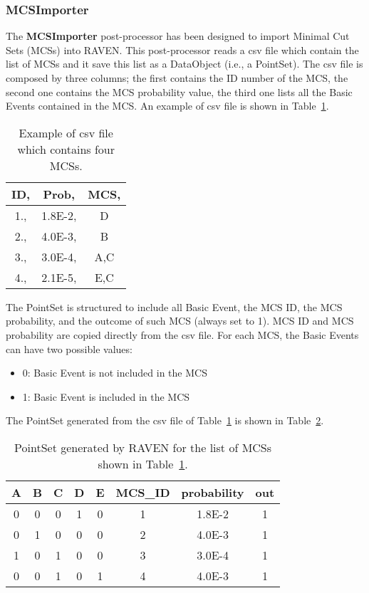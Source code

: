 
\subsubsection{MCSImporter}
\label{MCSimporterPP}
The \textbf{MCSImporter} post-processor has been designed to import Minimal Cut Sets (MCSs) into RAVEN.
This post-processor reads a csv file which contain the list of MCSs and it save this list as a DataObject 
(i.e.,  a PointSet).
The csv file is composed by three columns; the first contains the ID number of the MCS, the second one contains
the MCS probability value, the third one lists all the Basic Events contained in the MCS.
An example of csv file is shown in Table~\ref{MCScsv}.

\begin{table}[h]
    \centering
    \caption{Example of csv file which contains four MCSs.}
    \label{MCScsv}
	\begin{tabular}{c  c  c}
		\hline
		ID, & Prob, & MCS, \\
		\hline
		1.,  &  1.8E-2, &  D  \\
		2.,  &  4.0E-3, &  B \\
		3.,  &  3.0E-4, &  A,C  \\
		4.,  &  2.1E-5, &  E,C \\
		\hline
	\end{tabular}
\end{table}

The PointSet is structured to include all Basic Event, the MCS ID, the MCS probability, and the outcome of such MCS 
(always set to 1).
MCS ID and MCS probability are copied directly from the csv file.
For each MCS, the Basic Events can have two possible values:
  \begin{itemize}
    \item  0: Basic Event is not included in the MCS
    \item  1: Basic Event is included in the MCS
  \end{itemize}
The PointSet generated from the csv file of Table~\ref{MCScsv} is shown in Table~\ref{PointSetMCSExpandFalse}.
\begin{table}[h]
    \centering
    \caption{PointSet generated by RAVEN for the list of MCSs shown in Table~\ref{MCScsv}.}
    \label{PointSetMCSExpandFalse}
	\begin{tabular}{c | c | c | c | c | c | c | c }
		\hline
		A & B & C & D & E & MCS\_ID & probability & out \\
		\hline
		0 & 0 & 0 & 1 & 0 & 1 & 1.8E-2 & 1 \\
		0 & 1 & 0 & 0 & 0 & 2 & 4.0E-3 & 1 \\
		1 & 0 & 1 & 0 & 0 & 3 & 3.0E-4 & 1 \\
		0 & 0 & 1 & 0 & 1 & 4 & 4.0E-3 & 1 \\
		\hline
	\end{tabular}
\end{table}

